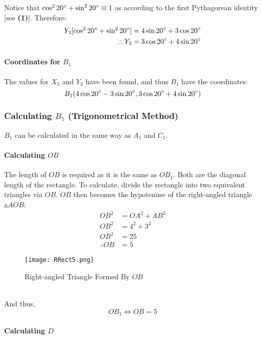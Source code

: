 \documentclass{article}
\begin{document}
            Notice that $\cos^2{20\degree} + \sin^2{20\degree} \equiv 1$ as according to the first Pythagorean identity [see \textbf{(1)}]. Therefore:
            \begin{align*}
                Y_3[\cos^2{20\degree} + \sin^2{20\degree}] &= 4\sin{20\degree} + 3\cos{20\degree} \\
                \therefore Y_3 &= 3\cos{20\degree} + 4\sin{20\degree}
            \end{align*}
            \paragraph{Coordinates for $B_1$} The values for $X_3$ and $Y_3$ have been found, and thus $B_1$ have the coordinates:
            \begin{equation}
                B_1(4\cos{20\degree} - 3\sin{20\degree}, 3\cos{20\degree} + 4\sin{20\degree})
            \end{equation} \newpage
            \subsubsection{Calculating $B_1$ (Trigonometrical Method)} $B_1$ can be calculated in the same way as $A_1$ and $C_1$.
            \paragraph{Calculating $OB$} The length of $OB$ is required as it is the same as $OB_1$. Both are the diagonal length of the rectangle. To calculate, divide the rectangle into two equivalent triangles via $OB$. $OB$ then becomes the hypotenuse of the right-angled triangle $\vartriangle{AOB}$:
            \begin{align*}
                OB^2 &= OA^2 + AB^2 \\
                OB^2 &= 4^2 + 3^2 \\
                OB^2 &= 25 \\
                \therefore OB &= 5
            \end{align*}
            \begin{figure}[h!]
                \texttt{[image: RRect5.png]}
                \caption{Right-angled Triangle Formed By $OB$}
                \label{fig:rrect5}
            \end{figure} \\
            And thus,
            \begin{equation}
                OB_1 \Leftrightarrow OB = 5
            \end{equation}
            \paragraph{Calculating $D$}
    \newpage
    
\end{document}
